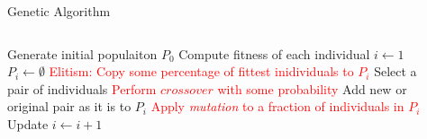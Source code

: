 \documentclass{beamer}
\begin{document}
\begin{frame}{Genetic Algorithm}
    \begin{columns}
        \begin{column}{0.66\linewidth}%
            \begin{spacing}{1}
                \fontsize{8}{12}\selectfont
                \setlength{\interspacetitleruled}{0pt}%
                \setlength{\algotitleheightrule}{0pt}%
                \begin{algorithm}[H]
                    Generate initial populaiton $P_0$\;
                    Compute fitness of each individual\;
                    $i \leftarrow 1$ \;
                     {
                        $P_i \leftarrow \emptyset$ \;
                        \textcolor{red}{Elitism: Copy some percentage of fittest inidividuals to $P_i$} \;
                         {
                            Select a pair of individuals  \;
                            \textcolor{red}{Perform $crossover$ with some probability}\;
                             Add new or original pair as it is to $P_i$\;
                        }
                        \textcolor{red}{Apply \textit{mutation} to a fraction of individuals in $P_i$}\;
                        Update $i \leftarrow i + 1$ \;
                    }
                \end{algorithm}
            \end{spacing}
        \end{column}
        \begin{column}{0.3\linewidth}
                \begin{figure}
                \end{figure}
        \end{column}
    \end{columns}
\end{frame}
\end{document}
